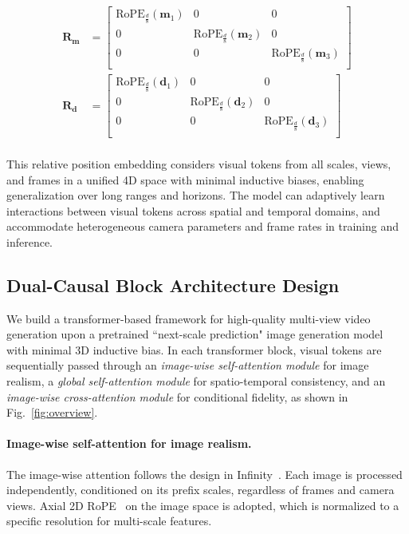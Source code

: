 \begin{equation}
\begin{aligned}
    \mathbf{R_m}&=\left[\begin{matrix}
        \text{RoPE}_{\frac{d}{8}}(\mathbf{m}_1) & 0 & 0\\
        0 & \text{RoPE}_{\frac{d}{8}}(\mathbf{m}_2) & 0\\
        0 & 0 & \text{RoPE}_{\frac{d}{8}}(\mathbf{m}_3)\\
    \end{matrix}\right]\\
    \mathbf{R_d}&=\left[\begin{matrix}
        \text{RoPE}_{\frac{d}{8}}(\mathbf{d}_1) & 0 & 0\\
        0 & \text{RoPE}_{\frac{d}{8}}(\mathbf{d}_2) & 0\\
        0 & 0 & \text{RoPE}_{\frac{d}{8}}(\mathbf{d}_3)\\
    \end{matrix}\right]\\ 
\end{aligned}
\end{equation}

This relative position embedding considers visual tokens from all scales, views, and frames in a unified 4D space with minimal inductive biases, enabling generalization over long ranges and horizons. The model can adaptively learn interactions between visual tokens across spatial and temporal domains, and accommodate heterogeneous camera parameters and frame rates in training and inference.

\subsection{Dual-Causal Block Architecture Design}
\label{sec:framework}

We build a transformer-based framework for high-quality multi-view video generation upon a pretrained ``next-scale prediction" image generation model~\cite{han2024infinity} with minimal 3D inductive bias. In each transformer block, visual tokens are sequentially passed through an \textit{image-wise self-attention module} for image realism, a \textit{global self-attention module} for spatio-temporal consistency, and an \textit{image-wise cross-attention module} for conditional fidelity, as shown in Fig.~\ref{fig:overview}.

\paragraph{Image-wise self-attention for image realism.} The image-wise attention follows the design in  Infinity~\cite{han2024infinity}. Each image is processed independently, conditioned on its prefix scales, regardless of frames and camera views. Axial 2D RoPE~\cite{heo2024rotary} on the image space is adopted, which is normalized to a specific resolution for multi-scale features.

